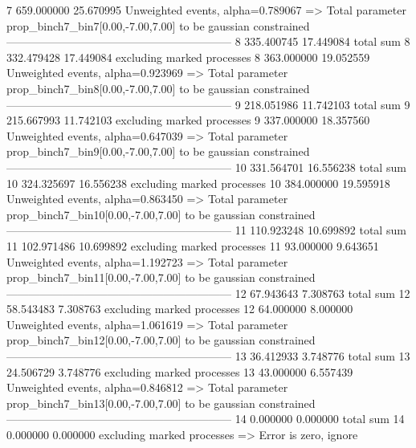 7          659.000000      25.670995       Unweighted events, alpha=0.789067
  => Total parameter prop_binch7_bin7[0.00,-7.00,7.00] to be gaussian constrained
------------------------------------------------------------
8          335.400745      17.449084       total sum                     
8          332.479428      17.449084       excluding marked processes    
8          363.000000      19.052559       Unweighted events, alpha=0.923969
  => Total parameter prop_binch7_bin8[0.00,-7.00,7.00] to be gaussian constrained
------------------------------------------------------------
9          218.051986      11.742103       total sum                     
9          215.667993      11.742103       excluding marked processes    
9          337.000000      18.357560       Unweighted events, alpha=0.647039
  => Total parameter prop_binch7_bin9[0.00,-7.00,7.00] to be gaussian constrained
------------------------------------------------------------
10         331.564701      16.556238       total sum                     
10         324.325697      16.556238       excluding marked processes    
10         384.000000      19.595918       Unweighted events, alpha=0.863450
  => Total parameter prop_binch7_bin10[0.00,-7.00,7.00] to be gaussian constrained
------------------------------------------------------------
11         110.923248      10.699892       total sum                     
11         102.971486      10.699892       excluding marked processes    
11         93.000000       9.643651        Unweighted events, alpha=1.192723
  => Total parameter prop_binch7_bin11[0.00,-7.00,7.00] to be gaussian constrained
------------------------------------------------------------
12         67.943643       7.308763        total sum                     
12         58.543483       7.308763        excluding marked processes    
12         64.000000       8.000000        Unweighted events, alpha=1.061619
  => Total parameter prop_binch7_bin12[0.00,-7.00,7.00] to be gaussian constrained
------------------------------------------------------------
13         36.412933       3.748776        total sum                     
13         24.506729       3.748776        excluding marked processes    
13         43.000000       6.557439        Unweighted events, alpha=0.846812
  => Total parameter prop_binch7_bin13[0.00,-7.00,7.00] to be gaussian constrained
------------------------------------------------------------
14         0.000000        0.000000        total sum                     
14         0.000000        0.000000        excluding marked processes    
  => Error is zero, ignore      
